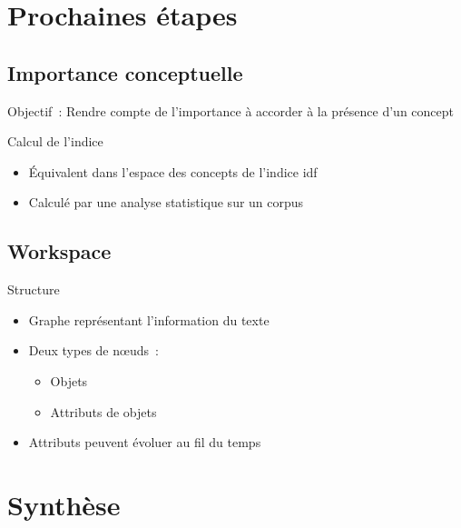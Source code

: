 \documentclass{beamer}
\begin{document}
\section{Prochaines étapes}
\subsection{Importance conceptuelle}
\begin{frame}
  \begin{block}{Objectif~:}
    Rendre compte de l'importance à accorder à la présence d'un concept
  \end{block}

  \begin{block}{Calcul de l'indice}
    \begin{itemize}
      \item Équivalent dans l'espace des concepts de l'indice idf
      \item Calculé par une analyse statistique sur un corpus
    \end{itemize}
  \end{block}
\end{frame}
\subsection{Workspace}
\begin{frame}
  \begin{block}{Structure}
  \begin{itemize}
    \item Graphe représentant l'information du texte
    \item Deux types de nœuds~:
      \begin{itemize}
        \item Objets
        \item Attributs de objets
      \end{itemize}
    \item Attributs peuvent évoluer au fil du temps
  \end{itemize}
  \end{block}
\end{frame}

\section{Synthèse}
\end{document}
